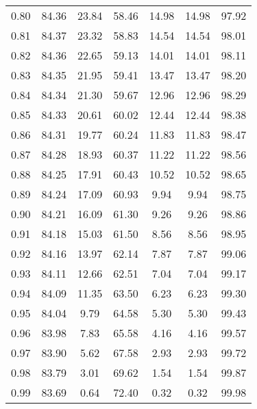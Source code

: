 \begin{tabular}{|c|c|c|c|c|c|c|}
      0.80 &     84.36 &     23.84 &      58.46 &   14.98 &      14.98 &         97.92 \\
      0.81 &     84.37 &     23.32 &      58.83 &   14.54 &      14.54 &         98.01 \\
      0.82 &     84.36 &     22.65 &      59.13 &   14.01 &      14.01 &         98.11 \\
      0.83 &     84.35 &     21.95 &      59.41 &   13.47 &      13.47 &         98.20 \\
      0.84 &     84.34 &     21.30 &      59.67 &   12.96 &      12.96 &         98.29 \\
      0.85 &     84.33 &     20.61 &      60.02 &   12.44 &      12.44 &         98.38 \\
      0.86 &     84.31 &     19.77 &      60.24 &   11.83 &      11.83 &         98.47 \\
      0.87 &     84.28 &     18.93 &      60.37 &   11.22 &      11.22 &         98.56 \\
      0.88 &     84.25 &     17.91 &      60.43 &   10.52 &      10.52 &         98.65 \\
      0.89 &     84.24 &     17.09 &      60.93 &    9.94 &       9.94 &         98.75 \\
      0.90 &     84.21 &     16.09 &      61.30 &    9.26 &       9.26 &         98.86 \\
      0.91 &     84.18 &     15.03 &      61.50 &    8.56 &       8.56 &         98.95 \\
      0.92 &     84.16 &     13.97 &      62.14 &    7.87 &       7.87 &         99.06 \\
      0.93 &     84.11 &     12.66 &      62.51 &    7.04 &       7.04 &         99.17 \\
      0.94 &     84.09 &     11.35 &      63.50 &    6.23 &       6.23 &         99.30 \\
      0.95 &     84.04 &      9.79 &      64.58 &    5.30 &       5.30 &         99.43 \\
      0.96 &     83.98 &      7.83 &      65.58 &    4.16 &       4.16 &         99.57 \\
      0.97 &     83.90 &      5.62 &      67.58 &    2.93 &       2.93 &         99.72 \\
      0.98 &     83.79 &      3.01 &      69.62 &    1.54 &       1.54 &         99.87 \\
      0.99 &     83.69 &      0.64 &      72.40 &    0.32 &       0.32 &         99.98 \\
\bottomrule
\end{tabular}
